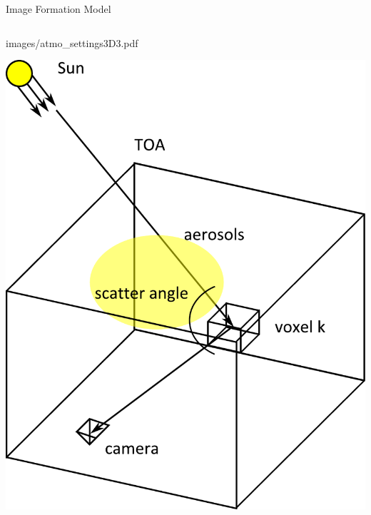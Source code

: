\documentclass[compress,red,12pt]{beamer}
\begin{document}
\begin{frame}{Image Formation Model}
\begin{columns}[c]
\begin{overprint}
{{          {images/atmo_settings3D3.pdf}}}
       {\centerline{\includegraphics[width=\columnwidth]
          {images/atmo_settings3D5.pdf}}}
    \end{overprint}

  \end{columns}
\end{frame}

\end{document}
